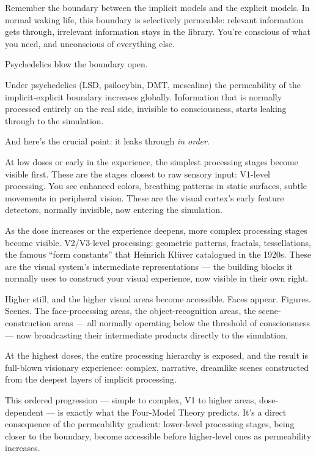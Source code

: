 \documentclass[11pt, twoside, openright]{book}
\begin{document}
Remember the boundary between the implicit models and the explicit models. In normal waking life, this boundary is selectively permeable: relevant information gets through, irrelevant information stays in the library. You're conscious of what you need, and unconscious of everything else.

Psychedelics blow the boundary open.

Under psychedelics (LSD, psilocybin, DMT, mescaline) the permeability of the implicit-explicit boundary increases globally. Information that is normally processed entirely on the real side, invisible to consciousness, starts leaking through to the simulation.

And here's the crucial point: it leaks through \textit{in order}.

At low doses or early in the experience, the simplest processing stages become visible first. These are the stages closest to raw sensory input: V1-level processing. You see enhanced colors, breathing patterns in static surfaces, subtle movements in peripheral vision. These are the visual cortex's early feature detectors, normally invisible, now entering the simulation.

As the dose increases or the experience deepens, more complex processing stages become visible. V2/V3-level processing: geometric patterns, fractals, tessellations, the famous ``form constants'' that Heinrich Klüver catalogued in the 1920s. These are the visual system's intermediate representations --- the building blocks it normally uses to construct your visual experience, now visible in their own right.

Higher still, and the higher visual areas become accessible. Faces appear. Figures. Scenes. The face-processing areas, the object-recognition areas, the scene-construction areas --- all normally operating below the threshold of consciousness --- now broadcasting their intermediate products directly to the simulation.

At the highest doses, the entire processing hierarchy is exposed, and the result is full-blown visionary experience: complex, narrative, dreamlike scenes constructed from the deepest layers of implicit processing.

This ordered progression --- simple to complex, V1 to higher areas, dose-dependent --- is exactly what the Four-Model Theory predicts. It's a direct consequence of the permeability gradient: lower-level processing stages, being closer to the boundary, become accessible before higher-level ones as permeability increases.
\end{document}

